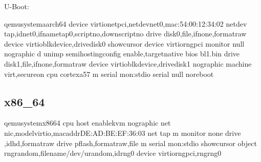 \documentclass[a4paper,10pt,oneside,english]{sphinxmanual}
\begin{document}
U-Boot:

\begin{sphinxVerbatim}[commandchars=\\\{\}]
qemu\PYGZhy{}system\PYGZhy{}aarch64 
   \PYGZhy{}device virtio\PYGZhy{}net\PYGZhy{}pci,netdevnet0,mac:54:00:12:34:02 \PYGZhy{}netdev tap,idnet0,ifnametap0,scriptno,downscriptno 
   \PYGZhy{}drive disk0,file,ifnone,formatraw \PYGZhy{}device virtio\PYGZhy{}blk\PYGZhy{}device,drivedisk0 \PYGZhy{}show\PYGZhy{}cursor 
   \PYGZhy{}device virtio\PYGZhy{}rng\PYGZhy{}pci \PYGZhy{}monitor null \PYGZhy{}nographic 
   \PYGZhy{}d unimp \PYGZhy{}semihosting\PYGZhy{}config enable,targetnative 
   \PYGZhy{}bios bl1.bin 
   \PYGZhy{}drive disk1,file,ifnone,formatraw 
   \PYGZhy{}device virtio\PYGZhy{}blk\PYGZhy{}device,drivedisk1  \PYGZhy{}nographic \PYGZhy{}machine virt,secureon \PYGZhy{}cpu cortex\PYGZhy{}a57 \PYGZhy{}m  \PYGZhy{}serial mon:stdio \PYGZhy{}serial null 
   \PYGZhy{}no\PYGZhy{}reboot
\end{sphinxVerbatim}


\subsection{x86\_64}
\label{\detokenize{chapter2-oe:id1}}
\begin{sphinxVerbatim}[commandchars=\\\{\}]
qemu\PYGZhy{}system\PYGZhy{}x86\PYGZus{}64 
   \PYGZhy{}cpu host \PYGZhy{}enable\PYGZhy{}kvm \PYGZhy{}nographic \PYGZhy{}net nic,modelvirtio,macaddrDE:AD:BE:EF:36:03 \PYGZhy{}net tap \PYGZhy{}m  \PYGZhy{}monitor none 
   \PYGZhy{}drive ,idhd,formatraw 
   \PYGZhy{}drive pflash,formatraw,file 
   \PYGZhy{}m  \PYGZhy{}serial mon:stdio \PYGZhy{}show\PYGZhy{}cursor \PYGZhy{}object rng\PYGZhy{}random,filename/dev/urandom,idrng0 \PYGZhy{}device virtio\PYGZhy{}rng\PYGZhy{}pci,rngrng0
\end{sphinxVerbatim}
\end{document}
